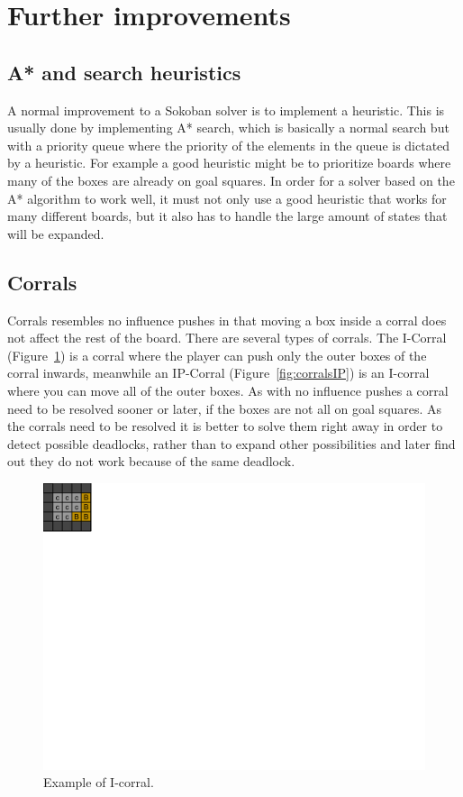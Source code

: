 \documentclass[a4paper,11pt]{article}
\renewcommand{\*}[0]{\cdot}
\begin{document}
\section{Further improvements}

\subsection{A* and search heuristics}

A normal improvement to a Sokoban solver is to implement a heuristic. This is
usually done by implementing A* search, which is basically a normal search but
with a priority queue where the priority of the elements in the queue is
dictated by a heuristic. For example a good heuristic might be to prioritize
boards where many of the boxes are already on goal squares. In order for a
solver based on the A* algorithm to work well, it must not only use a good
heuristic that works for many different boards, but it also has to handle the
large amount of states that will be expanded.


\subsection{Corrals}

Corrals resembles no influence pushes in that moving a box inside a corral does
not affect the rest of the board.  There are several types of corrals. The
I-Corral (Figure~\ref{fig:corralsI}) is a corral where the player can push only
the outer boxes of the corral inwards, meanwhile an IP-Corral
(Figure~\ref{fig:corralsIP}) is an I-corral where you can move all of the outer
boxes. As with no influence pushes a corral need to be resolved sooner or later,
if the boxes are not all on goal squares.  As the corrals need to be resolved it
is better to solve them right away in order to detect possible deadlocks, rather
than to expand other possibilities and later find out they do not work because
of the same deadlock.

\begin{figure}[h!]
    \begin{center}
        \includegraphics{figures/corralsI}
    \end{center}
    \caption{Example of I-corral.}
    \label{fig:corralsI}
\end{figure}
\end{document}
